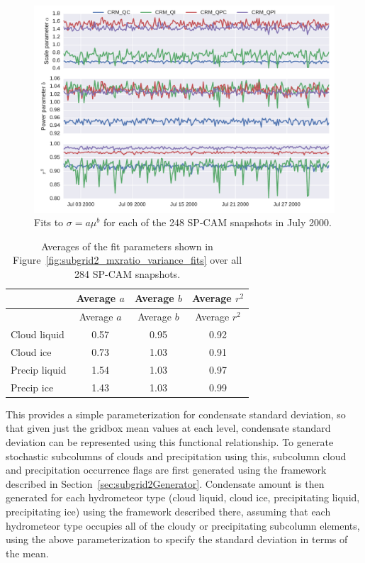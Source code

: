 \begin{figure}[htbp]
\centering
\includegraphics{graphics/subgrid2_mxratio_variance_fits.pdf}
\caption{\label{fig:subgrid2_mxratio_variance_fits}Fits to
\(\sigma = a \mu^b\) for each of the 248 SP-CAM snapshots in July
2000.}\label{fig:subgrid2ux5fmxratioux5fvarianceux5ffits}
\end{figure}

\begin{longtable}[]{@{}lccc@{}}
\caption{\label{tbl:subgrid2_mxratio_variance_fits_table}Averages of the
fit parameters shown in Figure~\ref{fig:subgrid2_mxratio_variance_fits}
over all 284 SP-CAM snapshots. }\tabularnewline
\toprule
& Average \(a\) & Average \(b\) & Average \(r^2\)\tabularnewline
\midrule
\endfirsthead
\toprule
& Average \(a\) & Average \(b\) & Average \(r^2\)\tabularnewline
\midrule
\endhead
Cloud liquid & 0.57 & 0.95 & 0.92\tabularnewline
Cloud ice & 0.73 & 1.03 & 0.91\tabularnewline
Precip liquid & 1.54 & 1.03 & 0.97\tabularnewline
Precip ice & 1.43 & 1.03 & 0.99\tabularnewline
\bottomrule
\end{longtable}

This provides a simple parameterization for condensate standard
deviation, so that given just the gridbox mean values at each level,
condensate standard deviation can be represented using this functional
relationship. To generate stochastic subcolumns of clouds and
precipitation using this, subcolumn cloud and precipitation occurrence
flags are first generated using the framework described in
Section~\ref{sec:subgrid2Generator}. Condensate amount is then generated
for each hydrometeor type (cloud liquid, cloud ice, precipitating
liquid, precipitating ice) using the framework described there, assuming
that each hydrometeor type occupies all of the cloudy or precipitating
subcolumn elements, using the above parameterization to specify the
standard deviation in terms of the mean.

